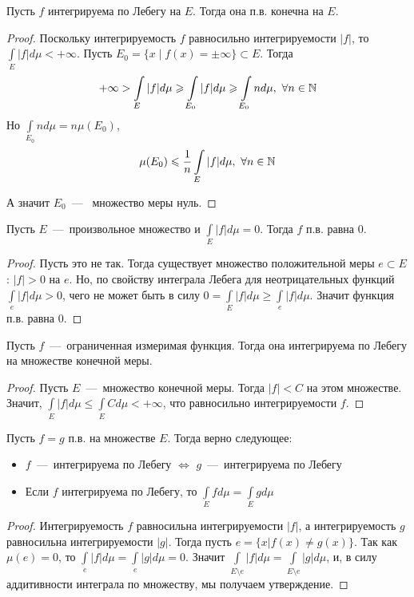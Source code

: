\begin{proposition}
    Пусть $f$ интегрируема по Лебегу на $E$. Тогда она п.в. конечна на $E$.
\end{proposition}
\begin{proof}
    Поскольку интегрируемость $f$ равносильно интегрируемости $|f|$, то $\int\limits_E |f|d\mu < +\infty$. Пусть $E_0 = \{x \mid f(x) = \pm\infty\} \subset E$. Тогда \[+\infty > \int\limits_{E} |f|d\mu \geqslant \int\limits_{E_0}|f|d\mu \geqslant \int\limits_{E_0} nd\mu, \ \forall n \in \mathbb{N}\]
    Но $\int\limits_{E_0} nd\mu = n\mu(E_0)$,
    \[
    \mu(E_0) \leqslant \frac{1}{n} \int\limits_{E} |f|d\mu, \ \forall n \in \mathbb{N}
    \]
    
    А значит $E_0$~---~ множество меры нуль.
\end{proof}

\begin{proposition}
    Пусть $E$~---~произвольное множество и $\int\limits_E |f|d\mu = 0$. Тогда $f$ п.в. равна $0$.
\end{proposition}
\begin{proof}
    Пусть это не так. Тогда существует множество положительной меры $e \subset E$: $|f| > 0$ на $e$. Но, по свойству интеграла Лебега для неотрицательных функций $\int\limits_e |f| d\mu > 0$, чего не может быть в силу $0 = \int\limits_E |f| d\mu \geq \int\limits_e |f|d\mu$. Значит функция п.в. равна $0$.
\end{proof}

\begin{proposition}
    Пусть $f$~---~ограниченная измеримая функция. Тогда она интегрируема по Лебегу на множестве конечной меры.
\end{proposition}
\begin{proof}
    Пусть $E$~---~множество конечной меры. Тогда $|f| < C$ на этом множестве. Значит, $\int\limits_E |f|d\mu \leq \int\limits_E Cd\mu < +\infty$, что равносильно интегрируемости $f$.
\end{proof}

\begin{proposition}
    Пусть $f = g$ п.в. на множестве $E$. Тогда верно следующее:
    \begin{itemize}
        \item $f$~---~интегрируема по Лебегу $\Longleftrightarrow$ $g$~---~интегрируема по Лебегу
        \item Если $f$ интегрируема по Лебегу, то $\int\limits_E fd\mu = \int\limits_E gd\mu$
    \end{itemize}
\end{proposition}
\begin{proof}
    Интегрируемость $f$ равносильна интегрируемости $|f|$, а интегрируемость $g$ равносильна интегрируемости $|g|$. Тогда пусть $e = \{x | f(x) \neq g(x)\}$. Так как $\mu(e) = 0$, то $\int\limits_e |f| d\mu = \int\limits_e |g|d\mu = 0$. Значит $\int\limits_{E\setminus e} |f|d\mu = \int\limits_{E\setminus e} |g|d\mu$, и, в силу аддитивности интеграла по множеству, мы получаем утверждение.
\end{proof}

